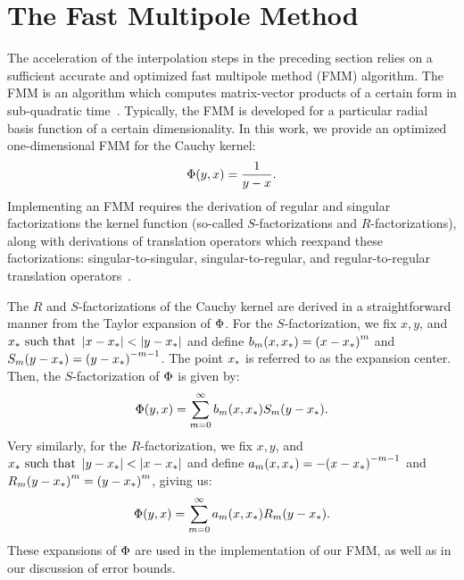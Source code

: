\section{The Fast Multipole Method}

The acceleration of the interpolation steps in the preceding section
relies on a sufficient accurate and optimized fast multipole method
(FMM) algorithm. The FMM is an algorithm which computes matrix-vector
products of a certain form in sub-quadratic
time~\cite{fmm-orig}. Typically, the FMM is developed for a particular
radial basis function of a certain dimensionality. In this work, we
provide an optimized one-dimensional FMM for the Cauchy kernel:
\begin{align}
  \label{eq:cauchy-kernel}
  \Phi(y, x) = \frac{1}{y - x}.
\end{align}
Implementing an FMM requires the derivation of regular and singular
factorizations the kernel function (so-called $S$-factorizations and
$R$-factorizations), along with derivations of translation operators
which reexpand these factorizations: singular-to-singular,
singular-to-regular, and regular-to-regular translation
operators~\cite{fmm-helmholtz}.

The $R$ and $S$-factorizations of the Cauchy kernel are derived in a
straightforward manner from the Taylor expansion of $\Phi$. For the
$S$-factorization, we fix $x, y$, and
${x}_{*} \mbox{ such that } \left|x-{x}_{*}\right| < \left|y-{x}_{*}\right|$ and define
$b_m(x, {x}_{*}) = {(x - {x}_{*})}^m$ and
$S_m(y - {x}_{*}) = {(y - {x}_{*})}^{-m-1}$. The point ${x}_{*}$ is
referred to as the expansion center. Then, the $S$-factorization of
$\Phi$ is given by:
\begin{align}
  \label{eq:S-factorization}
  \Phi(y, x) = \sum_{m=0}^\infty b_m(x, {x}_{*}) S_m(y - {x}_{*}).
\end{align}
Very similarly, for the $R$-factorization, we fix $x, y$, and
${x}_{*} \mbox{ such that } \left|y - {x}_{*}\right| < \left|x - {x}_{*}\right|$ and define
$a_m(x, {x}_{*}) = -{(x - {x}_{*})}^{-m-1}$ and
$R_m{(y - {x}_{*})}^m = {(y - {x}_{*})}^m$, giving us:
\begin{align}
  \label{eq:R-factorization}
  \Phi(y, x) = \sum_{m=0}^\infty a_m(x, {x}_{*}) R_m(y - {x}_{*}).
\end{align}
These expansions of $\Phi$ are used in the implementation of our FMM,
as well as in our discussion of error bounds.

